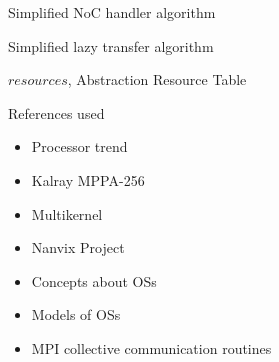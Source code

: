 \begin{backup}
\begin{frame}[fragile]{Simplified NoC handler algorithm}
	\end{frame}

	\begin{frame}[fragile]{Simplified lazy transfer algorithm}
			
		\begin{algorithm}
  			\scriptsize
			\begin{algorithmic}[1]
			\Require $resources$, Abstraction Resource Table


					\Else
					\EndIf
				\EndProcedure%


					\Else
					\EndIf
				\EndProcedure%


					                                
				\EndProcedure%

			\end{algorithmic}%

		\end{algorithm}

	\end{frame}

	\begin{frame}[fragile]{References used}
		\begin{itemize}
			\item Processor trend~\cite{url:microprocessor-trend-data}
			\item Kalray MPPA-256~\cite{DeDinechin2013-1}
			\item Multikernel~\cite{Baumann2009}
			\item Nanvix Project~\cite{penna2017-1,penna2017-2,penna2019,penna:rmen}
			\item Concepts about OSs~\cite{tanenbaum:4ed}
			\item Models of OSs~\cite{Silberschatz:9ed}
			\item MPI collective communication routines~\cite{mpi-survey,url:mpitutorial}
		\end{itemize}
	\end{frame}

\end{backup}

